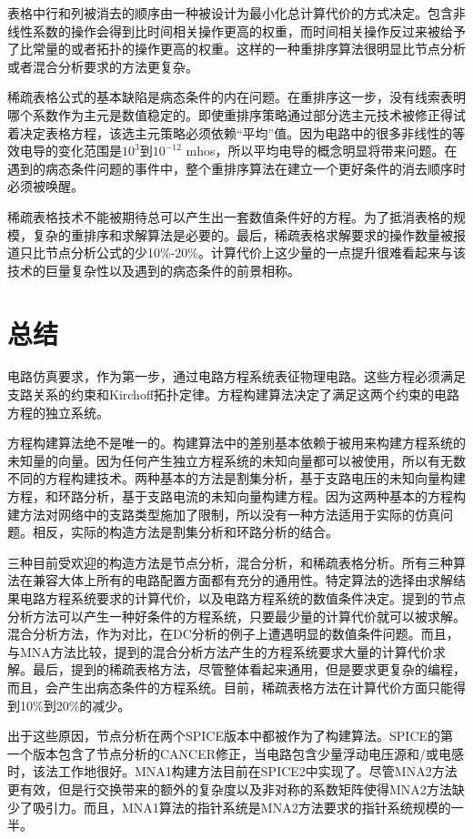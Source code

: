 表格中行和列被消去的顺序由一种被设计为最小化总计算代价的方式决定。包含非线性系数的操作会得到比时间相关操作更高的权重，而时间相关操作反过来被给予了比常量的或者拓扑的操作更高的权重。这样的一种重排序算法很明显比节点分析或者混合分析要求的方法更复杂。

稀疏表格公式的基本缺陷是病态条件的内在问题。在重排序这一步，没有线索表明哪个系数作为主元是数值稳定的。即使重排序策略通过部分选主元技术被修正得试着决定表格方程，该选主元策略必须依赖“平均”值。因为电路中的很多非线性的等效电导的变化范围是$10^3$到$10^{-12}$ mhos，所以平均电导的概念明显将带来问题。在遇到的病态条件问题的事件中，整个重排序算法在建立一个更好条件的消去顺序时必须被唤醒。

稀疏表格技术不能被期待总可以产生出一套数值条件好的方程。为了抵消表格的规模，复杂的重排序和求解算法是必要的。最后，稀疏表格求解要求的操作数量被报道只比节点分析公式的\cite{ref-46}少10\%-20\%。计算代价上这少量的一点提升很难看起来与该技术的巨量复杂性以及遇到的病态条件的前景相称。

\section{总结}
电路仿真要求，作为第一步，通过电路方程系统表征物理电路。这些方程必须满足支路关系的约束和Kirchoff拓扑定律。方程构建算法决定了满足这两个约束的电路方程的独立系统。

方程构建算法绝不是唯一的。构建算法中的差别基本依赖于被用来构建方程系统的未知量的向量。因为任何产生独立方程系统的未知向量都可以被使用，所以有无数不同的方程构建技术。两种基本的方法是割集分析，基于支路电压的未知向量构建方程，和环路分析，基于支路电流的未知向量构建方程。因为这两种基本的方程构建方法对网络中的支路类型施加了限制，所以没有一种方法适用于实际的仿真问题。相反，实际的构造方法是割集分析和环路分析的结合。

三种目前受欢迎的构造方法是节点分析，混合分析，和稀疏表格分析。所有三种算法在兼容大体上所有的电路配置方面都有充分的通用性。特定算法的选择由求解结果电路方程系统要求的计算代价，以及电路方程系统的数值条件决定。提到的节点分析方法可以产生一种好条件的方程系统，只要最少量的计算代价就可以被求解。混合分析方法，作为对比，在DC分析的例子上遭遇明显的数值条件问题。而且，与MNA方法比较，提到的混合分析方法产生的方程系统要求大量的计算代价求解。最后，提到的稀疏表格方法，尽管整体看起来通用，但是要求更复杂的编程，而且，会产生出病态条件的方程系统。目前，稀疏表格方法在计算代价方面只能得到10\%到20\%的减少。

出于这些原因，节点分析在两个SPICE版本中都被作为了构建算法。SPICE的第一个版本包含了节点分析的CANCER修正，当电路包含少量浮动电压源和/或电感时，该法工作地很好。MNA1构建方法目前在SPICE2中实现了。尽管MNA2方法更有效，但是行交换带来的额外的复杂度以及非对称的系数矩阵使得MNA2方法缺少了吸引力。而且，MNA1算法的指针系统是MNA2方法要求的指针系统规模的一半。
